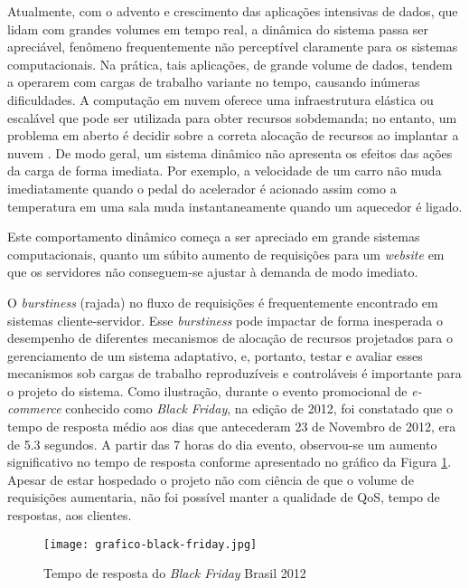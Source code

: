 Atualmente, com o advento e crescimento das aplicações intensivas de dados, que lidam com grandes volumes em tempo real, a dinâmica do sistema passa ser apreciável, fenômeno frequentemente não perceptível claramente para os sistemas computacionais. Na prática, tais aplicações, de grande volume de dados, tendem a operarem com cargas de trabalho variante no tempo, causando inúmeras dificuldades. A computação em nuvem oferece uma infraestrutura elástica ou escalável que pode ser utilizada para obter recursos sobdemanda; no entanto, um problema em aberto é decidir sobre a correta alocação de recursos ao implantar a nuvem \cite{Cervino2012}. De modo geral, um sistema dinâmico não apresenta os efeitos das ações da carga de forma imediata. Por exemplo, a velocidade de um carro não muda imediatamente quando o pedal do acelerador é acionado assim como a  temperatura em uma sala muda instantaneamente quando um aquecedor é ligado.

Este comportamento dinâmico começa a ser apreciado em grande sistemas computacionais, quanto um súbito aumento de requisições para um \textit{website} em que os servidores não conseguem-se ajustar à demanda de modo imediato. 

O \textit{burstiness} (rajada) no fluxo de requisições é frequentemente encontrado em sistemas cliente-servidor. Esse \textit{burstiness} pode impactar de forma inesperada o desempenho de diferentes mecanismos de alocação de recursos projetados para o gerenciamento de um sistema adaptativo, e, portanto, testar e avaliar esses mecanismos sob cargas de trabalho reproduzíveis e controláveis é importante para o projeto do sistema.  Como ilustração, durante o evento promocional de \textit{e-commerce} conhecido como \textit{Black Friday}, na edição de 2012, foi constatado que o tempo de resposta médio aos dias que antecederam 23 de Novembro de 2012, era de 5.3 segundos. A partir das 7 horas do dia evento, observou-se um aumento significativo no tempo de resposta conforme apresentado no gráfico da Figura \ref{fig:grafico-black-friday}. Apesar de estar hospedado o projeto não com ciência de que o volume de requisições aumentaria, não foi possível manter a qualidade de QoS, tempo de respostas, aos clientes.

\begin{figure}[htb]
	\centering
	\texttt{[image: grafico-black-friday.jpg]}
	\caption{Tempo de resposta do \textit{Black Friday} Brasil 2012}
	\label{fig:grafico-black-friday}
\end{figure}

